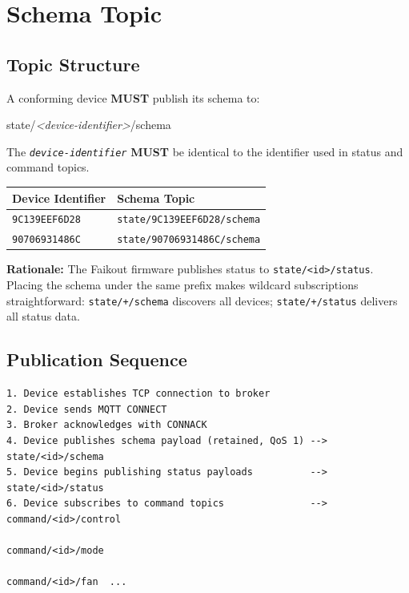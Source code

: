 \documentclass[11pt,a4paper]{article}
\newcommand{\must}{\textbf{MUST}}
\newcommand{\topic}[1]{\texttt{\color{accent}#1}}
\begin{document}
\section{Schema Topic}

\subsection{Topic Structure}

A conforming device \must{} publish its schema to:

\begin{center}
  \large\ttfamily\color{accent}
  state/\textit{\textless device-identifier\textgreater}/schema
\end{center}

The \texttt{\textit{device-identifier}} \must{} be identical to the identifier used in status and command topics.

\vspace{4pt}
\begin{tabular}{@{}ll@{}}
\toprule
\textbf{Device Identifier} & \textbf{Schema Topic} \\
\midrule
\rowcolor{lightbg}
\texttt{9C139EEF6D28} & \topic{state/9C139EEF6D28/schema} \\
\texttt{90706931486C} & \topic{state/90706931486C/schema} \\
\bottomrule
\end{tabular}
\vspace{4pt}

\textbf{Rationale:} The Faikout firmware publishes status to \topic{state/\textless id\textgreater/status}. Placing the schema under the same prefix makes wildcard subscriptions straightforward: \topic{state/+/schema} discovers all devices; \topic{state/+/status} delivers all status data.

\subsection{Publication Sequence}

\begin{lstlisting}[style=json, language={}]
1. Device establishes TCP connection to broker
2. Device sends MQTT CONNECT
3. Broker acknowledges with CONNACK
4. Device publishes schema payload (retained, QoS 1) --> state/<id>/schema
5. Device begins publishing status payloads          --> state/<id>/status
6. Device subscribes to command topics               --> command/<id>/control
                                                         command/<id>/mode
                                                         command/<id>/fan  ...
\end{lstlisting}
\end{document}
